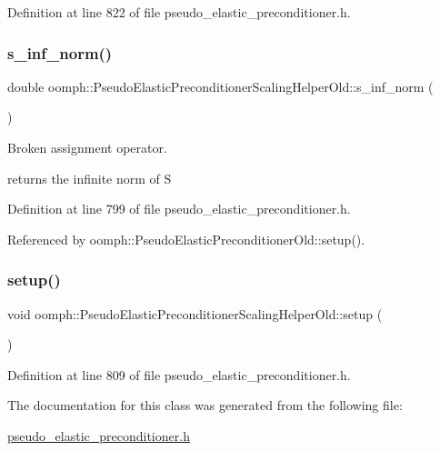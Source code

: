Definition at line 822 of file pseudo\+\_\+elastic\+\_\+preconditioner.\+h.

\mbox{\label{classoomph_1_1PseudoElasticPreconditionerScalingHelperOld_a4774c6db30bd4f7d054e438add48f7eb}} 
\subsubsection{\texorpdfstring{s\+\_\+inf\+\_\+norm()}{s\_inf\_norm()}}
{\footnotesize\ttfamily double oomph\+::\+Pseudo\+Elastic\+Preconditioner\+Scaling\+Helper\+Old\+::s\+\_\+inf\+\_\+norm (\begin{DoxyParamCaption}{ }\end{DoxyParamCaption})\hspace{0.3cm}{\ttfamily [inline]}}



Broken assignment operator. 

returns the infinite norm of S 

Definition at line 799 of file pseudo\+\_\+elastic\+\_\+preconditioner.\+h.



Referenced by oomph\+::\+Pseudo\+Elastic\+Preconditioner\+Old\+::setup().

\mbox{\label{classoomph_1_1PseudoElasticPreconditionerScalingHelperOld_a42dca15c6f3678880f3b84ccb91513c7}} 
\subsubsection{\texorpdfstring{setup()}{setup()}}
{\footnotesize\ttfamily void oomph\+::\+Pseudo\+Elastic\+Preconditioner\+Scaling\+Helper\+Old\+::setup (\begin{DoxyParamCaption}{ }\end{DoxyParamCaption})\hspace{0.3cm}{\ttfamily [inline]}}



Definition at line 809 of file pseudo\+\_\+elastic\+\_\+preconditioner.\+h.



The documentation for this class was generated from the following file\+:\begin{DoxyCompactItemize}
\item 
\hyperlink{pseudo__elastic__preconditioner_8h}{pseudo\+\_\+elastic\+\_\+preconditioner.\+h}\end{DoxyCompactItemize}
